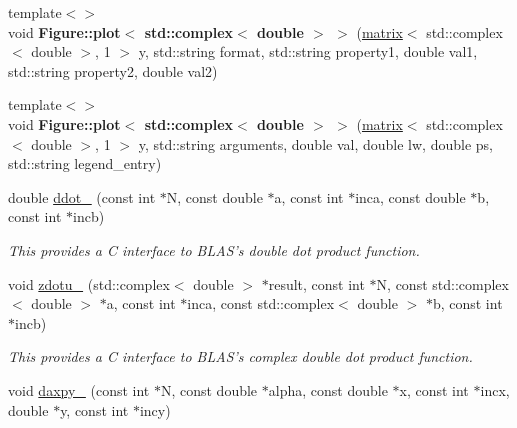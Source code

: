 \begin{DoxyCompactItemize}
\item 
\hypertarget{namespacekeycpp_a83249f0263926905c67d2a177495eef8}{{\footnotesize template$<$$>$ }\\void {\bfseries Figure\-::plot$<$ std\-::complex$<$ double $>$ $>$} (\hyperlink{classkeycpp_1_1matrix}{matrix}$<$ std\-::complex$<$ double $>$, 1 $>$ y, std\-::string format, std\-::string property1, double val1, std\-::string property2, double val2)}\label{namespacekeycpp_a83249f0263926905c67d2a177495eef8}

\item 
\hypertarget{namespacekeycpp_a7368f9a35fb8dbc5c29420fb9677ea30}{{\footnotesize template$<$$>$ }\\void {\bfseries Figure\-::plot$<$ std\-::complex$<$ double $>$ $>$} (\hyperlink{classkeycpp_1_1matrix}{matrix}$<$ std\-::complex$<$ double $>$, 1 $>$ y, std\-::string arguments, double val, double lw, double ps, std\-::string legend\-\_\-entry)}\label{namespacekeycpp_a7368f9a35fb8dbc5c29420fb9677ea30}

\item 
\hypertarget{namespacekeycpp_a55e50932cc54f92bdd7e38c6438f4f1f}{double \hyperlink{namespacekeycpp_a55e50932cc54f92bdd7e38c6438f4f1f}{ddot\-\_\-} (const int $\ast$N, const double $\ast$a, const int $\ast$inca, const double $\ast$b, const int $\ast$incb)}\label{namespacekeycpp_a55e50932cc54f92bdd7e38c6438f4f1f}

\begin{DoxyCompactList}\small\item\em This provides a C interface to B\-L\-A\-S's double dot product function. \end{DoxyCompactList}\item 
\hypertarget{namespacekeycpp_a2ce99b4fe4a13b9c70ada81761eb0ca2}{void \hyperlink{namespacekeycpp_a2ce99b4fe4a13b9c70ada81761eb0ca2}{zdotu\-\_\-} (std\-::complex$<$ double $>$ $\ast$result, const int $\ast$N, const std\-::complex$<$ double $>$ $\ast$a, const int $\ast$inca, const std\-::complex$<$ double $>$ $\ast$b, const int $\ast$incb)}\label{namespacekeycpp_a2ce99b4fe4a13b9c70ada81761eb0ca2}

\begin{DoxyCompactList}\small\item\em This provides a C interface to B\-L\-A\-S's complex double dot product function. \end{DoxyCompactList}\item 
\hypertarget{namespacekeycpp_ae99c5b242a21ba683701ccb6ab6534b1}{void \hyperlink{namespacekeycpp_ae99c5b242a21ba683701ccb6ab6534b1}{daxpy\-\_\-} (const int $\ast$N, const double $\ast$alpha, const double $\ast$x, const int $\ast$incx, double $\ast$y, const int $\ast$incy)}\label{namespacekeycpp_ae99c5b242a21ba683701ccb6ab6534b1}


\end{DoxyCompactItemize}
